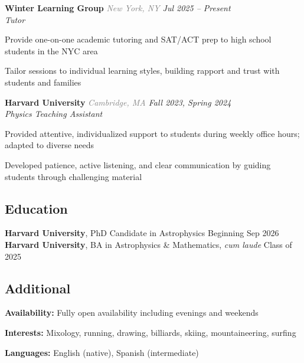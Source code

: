 \documentclass[11pt,letterpaper]{article}
\begin{document}
\vspace{6pt}

\textbf{Winter Learning Group} {\small\textit{\textcolor{gray}{New York, NY} \hfill \textcolor{niceblue}{Jul 2025 -- Present}}}\\
\textit{Tutor}
\begin{bulletdescription}
    \item Provide one-on-one academic tutoring and SAT/ACT prep to high school students in the NYC area
    \item Tailor sessions to individual learning styles, building rapport and trust with students and families
\end{bulletdescription}

\vspace{6pt}

\textbf{Harvard University} {\small\textit{\textcolor{gray}{Cambridge, MA} \hfill \textcolor{niceblue}{Fall 2023, Spring 2024}}}\\
\textit{Physics Teaching Assistant}
\begin{bulletdescription}
    \item Provided attentive, individualized support to students during weekly office hours; adapted to diverse needs
    \item Developed patience, active listening, and clear communication by guiding students through challenging material
\end{bulletdescription}

\subsection{Education}

\textbf{Harvard University}, PhD Candidate in Astrophysics \hfill \textcolor{niceblue}{Beginning Sep 2026}\\
\textbf{Harvard University}, BA in Astrophysics \& Mathematics, \textit{cum laude} \hfill \textcolor{niceblue}{Class of 2025}\\

\subsection{Additional}

\begin{list}{}{\cvlist}
    \item \textbf{Availability:} Fully open availability including evenings and weekends
    \item \textbf{Interests:} Mixology, running, drawing, billiards, skiing, mountaineering, surfing
    \item \textbf{Languages:} English (native), Spanish (intermediate)
\end{list}
\end{document}
